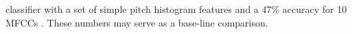 \documentclass{article}
\begin{document}
classifier with a set of simple pitch histogram features and a 47\% accuracy for 10 MFCCs \cite{tzanetakis_musical_2002}. These numbers may serve as a base-line comparison. 


\end{document}
